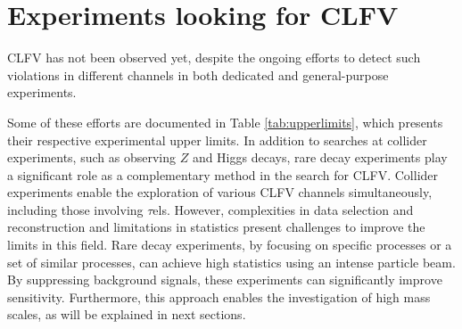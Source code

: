 % 
\section{Experiments looking for CLFV}
CLFV has not been observed yet, despite the ongoing efforts to detect such {\red violations} in different channels in both dedicated and general-purpose experiments.



Some of these efforts are documented in Table \ref{tab:upperlimits}, which presents their respective experimental upper limits. 
In addition to searches at collider experiments, such as observing $Z$ and 
Higgs decays, rare decay experiments play a significant role as a complementary method in the search for CLFV. 
Collider experiments enable the exploration of various CLFV channels simultaneously, including those involving $\tau$el{s}. 
However, complexities in data selection and reconstruction and limitations in statistics present challenges to improve the limits in this field.
Rare decay experiments, by focusing on specific processes or a set of similar processes, can achieve high statistics using an intense particle beam. 
By suppressing background signals, these experiments can significantly improve sensitivity. Furthermore, this approach 
enables the investigation of high mass scales, as will be explained in next sections.


